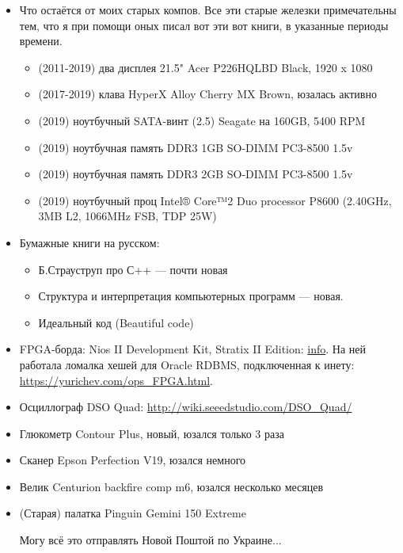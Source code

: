\begin{itemize}
\item Что остаётся от моих старых компов. Все эти старые железки примечательны тем, что я при помощи оных писал вот эти вот книги, в указанные периоды времени.
	\begin{itemize}
	\item (2011-2019) два дисплея 21.5" Acer P226HQLBD Black, 1920 x 1080 
	\item (2017-2019) клава HyperX Alloy Cherry MX Brown, юзалась активно
        \item (2019) ноутбучный SATA-винт (2.5) Seagate на 160GB, 5400 RPM
        \item (2019) ноутбучная память DDR3 1GB SO-DIMM PC3-8500 1.5v
        \item (2019) ноутбучная память DDR3 2GB SO-DIMM PC3-8500 1.5v
        \item (2019) ноутбучный проц Intel® Core™2 Duo processor P8600 (2.40GHz, 3MB L2, 1066MHz FSB, TDP 25W)
	\end{itemize}

\item Бумажные книги на русском:
	\begin{itemize}
	\item Б.Страуструп про С++ --- почти новая
	\item Структура и интерпретация компьютерных программ --- новая.
	\item Идеальный код (Beautiful code)
	\end{itemize}

\item FPGA-борда: Nios II Development Kit, Stratix II Edition: \href{https://www.intel.com/content/www/us/en/programmable/products/boards_and_kits/dev-kits/altera/kit-niosii-2s60.html}{info}.
На ней работала ломалка хешей для Oracle RDBMS, подключенная к инету: \url{https://yurichev.com/ops_FPGA.html}.
\item Осциллограф DSO Quad: \url{http://wiki.seeedstudio.com/DSO_Quad/}
\item Глюкометр Contour Plus, новый, юзался только 3 раза
\item Сканер Epson Perfection V19, юзался немного
\item Велик Centurion backfire comp m6, юзался несколько месяцев

\item (Старая) палатка Pinguin Gemini 150 Extreme

Могу всё это отправлять Новой Поштой по Украине...

\end{itemize}


